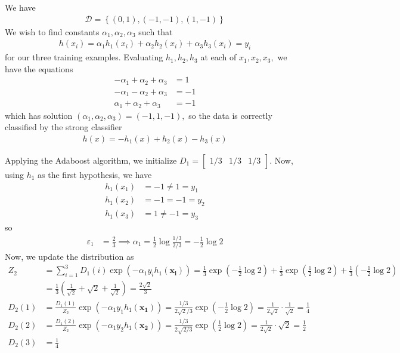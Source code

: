\documentclass{article}
\begin{document}
\begin{soln}
	We have
	\begin{align*}
		\mathcal D = \left\{ (0, 1), (-1, -1), (1, -1) \right\}
	\end{align*}
	We wish to find constants $\alpha_1, \alpha_2, \alpha_3$ such that
	\begin{align*}
		h(x_i) = \alpha_1h_1(x_i) + \alpha_2h_2(x_i) + \alpha_3h_3(x_i) = y_i
	\end{align*}
	for our three training examples. Evaluating $h_1, h_2, h_3$ at each of $x_1, x_2, x_3,$ we have the equations
	\begin{align*}
		-\alpha_1 + \alpha_2 + \alpha_3 &= 1 \\
		-\alpha_1 - \alpha_2 + \alpha_3 &= -1 \\
		\alpha_1+\alpha_2+\alpha_3 &= -1
	\end{align*}
	which has solution $(\alpha_1, \alpha_2, \alpha_3) = (-1, 1, -1),$ so the data is correctly classified by the strong classifier 
	\begin{align*}
		h(x) = -h_1(x) + h_2(x) - h_3(x)
	\end{align*}

	Applying the Adaboost algorithm, we initialize $D_1 = \begin{bmatrix}
		1/3 & 1/3 & 1/3
	\end{bmatrix}.$ Now, using $h_1$ as the first hypothesis, we have
	\begin{align*}
		h_1(x_1) &= -1 \neq 1 = y_1 \\
		h_1(x_2) &= -1 = -1 = y_2 \\
		h_1(x_3) &= 1\neq -1 = y_3
	\end{align*}
	so
	\begin{align*}
		\varepsilon_1 &= \frac{2}{3} \implies \alpha_1 = \frac{1}{2}\log \frac{1/3}{2/3} = -\frac{1}{2}\log 2 
	\end{align*}
	Now, we update the distribution as
	\begin{align*}
		Z_2 &= \sum_{i=1}^{3} D_1(i) \exp(-\alpha_1 y_i h_1(\mathbf{x_i})) = \frac{1}{3} \exp\left( -\frac{1}{2}\log 2 \right) + \frac{1}{3}\exp\left( \frac{1}{2}\log 2 \right) + \frac{1}{3}\left( -\frac{1}{2}\log 2 \right) \\
		&= \frac{1}{3} \left( \frac{1}{\sqrt{2}} + \sqrt{2} + \frac{1}{\sqrt{2}} \right) = \frac{2\sqrt{2}}{3} \\
		D_2(1) &= \frac{D_1(1)}{Z_2} \exp\left( -\alpha_1y_1h_1(\mathbf{x_1}) \right) = \frac{1/3}{2\sqrt{2}/3} \exp\left( -\frac{1}{2}\log 2 \right) = \frac{1}{2\sqrt{2}}\cdot \frac{1}{\sqrt{2}} =\frac{1}{4} \\
		D_2(2) &= \frac{D_1(2)}{Z_2}\exp\left( -\alpha_1y_2h_1(\mathbf{x_2}) \right) = \frac{1/3}{2\sqrt{2/3}}\exp\left( \frac{1}{2}\log 2 \right) = \frac{1}{2\sqrt{2}}\cdot \sqrt{2} = \frac{1}{2} \\
		D_2(3) &= \frac{1}{4}
	\end{align*}


\end{soln}
\end{document}

